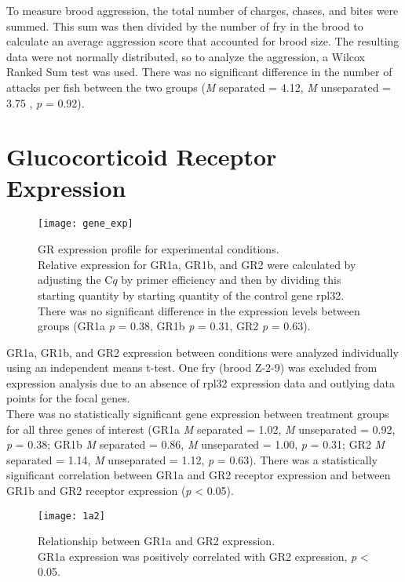 \documentclass[12pt,twoside]{reedthesis}
\begin{document}
To measure brood aggression, the total number of charges, chases, and
bites were summed. This sum was then divided by the number of fry in the brood
to calculate an average aggression score that accounted for brood size. The
resulting data were not normally distributed, so to analyze the aggression, a Wilcox Ranked Sum test was used. There was no
significant difference in the number of attacks per fish between the two groups (\textit{M} separated = 4.12, \textit{M} unseparated = 3.75 , \textit{p} = 0.92).

\section{Glucocorticoid Receptor Expression}

\begin{figure}[htbp] 
\begin{center} 
\texttt{[image: gene\_exp]}
\caption[GR expression profile for experimental
conditions]{\footnotesize{GR expression profile for experimental
      conditions.\\ Relative expression for GR1a, GR1b, and GR2 were calculated
  by adjusting the C$q$ by primer efficiency and then by dividing this starting
  quantity by starting quantity of the control gene rpl32. There was no
  significant difference in the expression levels between groups (GR1a
  \textit{p} = 0.38, GR1b \textit{p} = 0.31, GR2 \textit{p} = 0.63).}}
\label{subd}
\end{center} 
\end{figure}

 GR1a, GR1b, and GR2 expression between conditions were analyzed individually using an independent means
t-test. One fry (brood Z-2-9) was excluded from expression analysis due to an
absence of rpl32 expression data and outlying data points for the focal genes.\\
There was no statistically significant gene expression between treatment groups
for all three genes of interest (GR1a \textit{M} separated = 1.02, \textit{M}
unseparated = 0.92, \textit{p} = 0.38; GR1b \textit{M} separated = 0.86, \textit{M}
unseparated = 1.00, \textit{p} = 0.31; GR2 \textit{M} separated = 1.14, \textit{M}
unseparated = 1.12, \textit{p} = 0.63). There was a statistically significant
correlation between GR1a and GR2 receptor expression and between GR1b and GR2
receptor expression (\textit{p} < 0.05).

\begin{figure}[htbp] 
\begin{center} 
\texttt{[image: 1a2]}
\caption[Relationship between GR1a and GR2
expression]{\footnotesize{Relationship between GR1a and GR2 expression.\\ GR1a
    expression was positively correlated with GR2 expression, \textit{p} < 0.05.}}
\label{subd}
\end{center} 
\end{figure}
\end{document}
